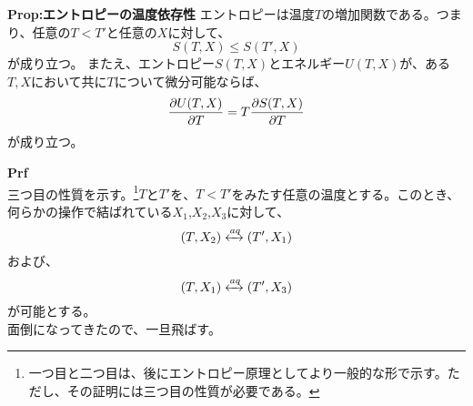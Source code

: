 \documentclass[a4paper,11pt]{jsarticle}
\begin{document}
\begin{itembox}[l]{\textbf{Prop:エントロピーの温度依存性}}
エントロピーは温度$T$の増加関数である。つまり、任意の$T<T'$と任意の$X$に対して、
\begin{equation}
    S(T,X) \leq S(T',X)
\end{equation}
が成り立つ。
またえ、エントロピー$S(T,X)$とエネルギー$U(T,X)$が、ある$T,X$において共に$T$について微分可能ならば、
\begin{equation}
    \pdv{U(T,X)}{T} = T\pdv{S(T,X)}{T}
\end{equation}
が成り立つ。
\end{itembox}
\textbf{Prf}\\
三つ目の性質を示す。\footnote{一つ目と二つ目は、後にエントロピー原理としてより一般的な形で示す。ただし、その証明には三つ目の性質が必要である。}$T$と$T'$を、$T < T'$をみたす任意の温度とする。このとき、何らかの操作で結ばれている$X_1$,$X_2$,$X_3$に対して、
\begin{equation}
    (T,X_2) \xleftrightarrow{aq} (T',X_1)
\end{equation}
および、
\begin{equation}
    (T,X_1) \xleftrightarrow{aq} (T',X_3)
\end{equation}
が可能とする。\\
面倒になってきたので、一旦飛ばす。\\
\end{document}
